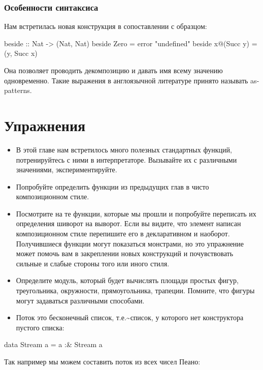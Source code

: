 \subsubsection{Особенности синтаксиса}

Нам встретилась новая конструкция в сопоставлении с образцом:


\begin{code}
beside :: Nat -> (Nat, Nat)
beside  Zero       = error "undefined"
beside  x@(Succ y) = (y, Succ x)
\end{code}

Она позволяет проводить декомпозицию и давать имя всему значению
одновременно. Такие выражения  в англоязычной литературе
принято называть as-patterns.

\section{Упражнения}

\begin{itemize}
\item
  В этой главе нам встретилось много полезных стандартных функций,
  потренируйтесь с ними в интерпретаторе. Вызывайте их с различными
  значениями, экспериментируйте.
\item
  Попробуйте определить функции из предыдущих глав в чисто
  композиционном стиле.
\item
  Посмотрите на те функции, которые мы прошли и попробуйте переписать их
  определения шиворот на выворот. Если вы видите, что элемент написан
  композиционном стиле перепишите его в декларативном и наоборот.
  Получившиеся функции могут показаться монстрами, но это упражнение
  может помочь вам в закреплении новых конструкций и почувствовать
  сильные и слабые стороны того или иного стиля.
\item
  Определите модуль, который будет вычислять площади простых фигур,
  треугольника, окружности, прямоугольника, трапеции. Помните, что
  фигуры могут задаваться различными способами.
\item
  Поток это бесконечный список, т.е.\textasciitilde{}список, у которого
  нет конструктора пустого списка:
\end{itemize}


\begin{code}
data Stream a = a :& Stream a
\end{code}

Так например мы можем составить поток из всех чисел Пеано:


